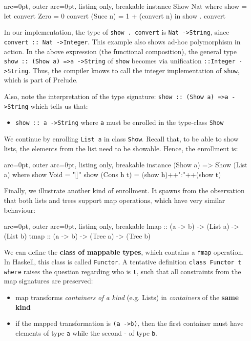 \begin{tcblisting}{ arc=0pt, outer arc=0pt, listing only, breakable}
instance Show Nat where
    show = 
      let convert Zero = 0
          convert (Succ n) = 1 + (convert n)
      in show . convert

\end{tcblisting}


In our implementation, the type of \texttt{show . convert} is \texttt{Nat -\textgreater  String}, since \texttt{convert :: Nat -\textgreater  Integer}. This example also shows ad-hoc polymorphism in action. In the above expression (the functional composition), the general type \texttt{show :: (Show a) =\textgreater  a -\textgreater  String} of \texttt{show} becomes via unification \texttt{::Integer -\textgreater  String}. Thus, the compiler knows to call the integer implementation of \texttt{show}, which is part of Prelude.

Also, note the interpretation of the type signature: \texttt{show :: (Show a) =\textgreater  a -\textgreater  String} which tells us that:
\begin{itemize}
	\item  \texttt{show :: a -\textgreater  String} where \texttt{a} must be enrolled in the type-class \texttt{Show}
\end{itemize}

We continue by enrolling \texttt{List a} in class \texttt{Show}. Recall that, to be able to show lists, the elements from the list need to be showable. Hence, the enrollment is:


\begin{tcblisting}{ arc=0pt, outer arc=0pt, listing only, breakable}
instance (Show a) => Show (List a) where
    show Void = "[]"
    show (Cons h t) = (show h)++":"++(show t)

\end{tcblisting}


Finally, we illustrate another kind of enrollment. It spawns from the observation that both lists and trees support map operations, which have very similar behaviour:


\begin{tcblisting}{ arc=0pt, outer arc=0pt, listing only, breakable}
lmap :: (a -> b) -> (List a) -> (List b)
tmap :: (a -> b) -> (Tree a) -> (Tree b)

\end{tcblisting}


We can define the \textbf{class of mappable types}, which contains a \texttt{fmap} operation. In Haskell, this class is called \texttt{Functor}. A tentative definition \texttt{class Functor t where} raises the question regarding who is \texttt{t}, such that all constraints from the map signatures are preserved:
\begin{itemize}
	\item  map transforms \textit{containers of a kind} (e.g. Lists) in \textit{containers} of the \textbf{same kind}
	\item  if the mapped transformation is \texttt{(a -\textgreater  b)}, then the first container must have elements of type \texttt{a} while the second - of type \texttt{b}.
\end{itemize}

